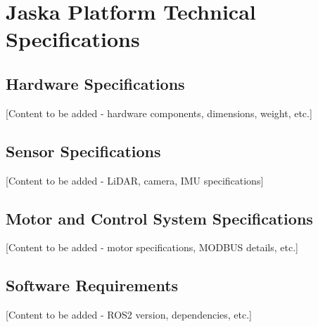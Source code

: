 
\chapter{Jaska Platform Technical Specifications}


\section{Hardware Specifications}

[Content to be added - hardware components, dimensions, weight, etc.]

\section{Sensor Specifications}

[Content to be added - LiDAR, camera, IMU specifications]

\section{Motor and Control System Specifications}

[Content to be added - motor specifications, MODBUS details, etc.]

\section{Software Requirements}

[Content to be added - ROS2 version, dependencies, etc.]
